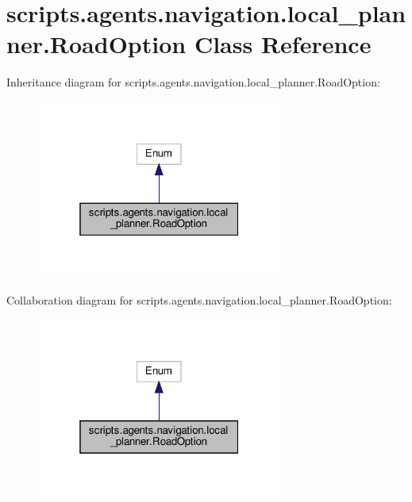 \hypertarget{classscripts_1_1agents_1_1navigation_1_1local__planner_1_1RoadOption}{}\section{scripts.\+agents.\+navigation.\+local\+\_\+planner.\+Road\+Option Class Reference}
\label{classscripts_1_1agents_1_1navigation_1_1local__planner_1_1RoadOption}


Inheritance diagram for scripts.\+agents.\+navigation.\+local\+\_\+planner.\+Road\+Option\+:
\nopagebreak
\begin{figure}[H]
\begin{center}
\leavevmode
\includegraphics[width=229pt]{dd/df3/classscripts_1_1agents_1_1navigation_1_1local__planner_1_1RoadOption__inherit__graph}
\end{center}
\end{figure}


Collaboration diagram for scripts.\+agents.\+navigation.\+local\+\_\+planner.\+Road\+Option\+:
\nopagebreak
\begin{figure}[H]
\begin{center}
\leavevmode
\includegraphics[width=229pt]{d0/dfb/classscripts_1_1agents_1_1navigation_1_1local__planner_1_1RoadOption__coll__graph}
\end{center}
\end{figure}
